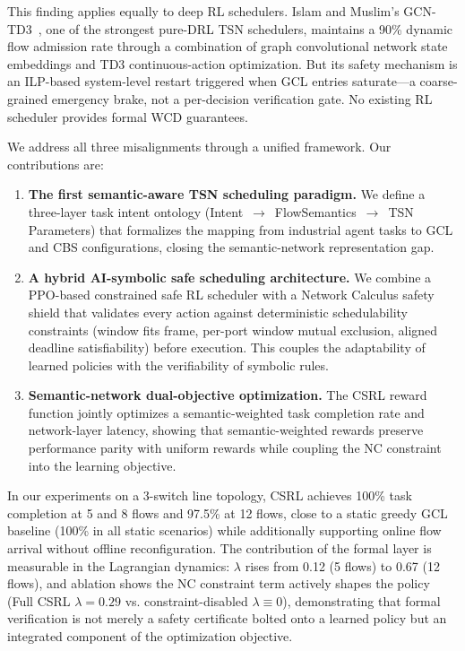 \documentclass[conference]{IEEEtran}
\begin{document}
This finding applies equally to deep RL schedulers. Islam and Muslim's GCN-TD3~\cite{islam2024gcntd3}, one of the strongest pure-DRL TSN schedulers, maintains a 90\% dynamic flow admission rate through a combination of graph convolutional network state embeddings and TD3 continuous-action optimization. But its safety mechanism is an ILP-based system-level restart triggered when GCL entries saturate---a coarse-grained emergency brake, not a per-decision verification gate. No existing RL scheduler provides formal WCD guarantees.

We address all three misalignments through a unified framework. Our contributions are:

\begin{enumerate}
\item \textbf{The first semantic-aware TSN scheduling paradigm.} We define a three-layer task intent ontology (Intent~$\rightarrow$~FlowSemantics~$\rightarrow$~TSN Parameters) that formalizes the mapping from industrial agent tasks to GCL and CBS configurations, closing the semantic-network representation gap.
\item \textbf{A hybrid AI-symbolic safe scheduling architecture.} We combine a PPO-based constrained safe RL scheduler with a Network Calculus safety shield that validates every action against deterministic schedulability constraints (window fits frame, per-port window mutual exclusion, aligned deadline satisfiability) before execution. This couples the adaptability of learned policies with the verifiability of symbolic rules.
\item \textbf{Semantic-network dual-objective optimization.} The CSRL reward function jointly optimizes a semantic-weighted task completion rate and network-layer latency, showing that semantic-weighted rewards preserve performance parity with uniform rewards while coupling the NC constraint into the learning objective.
\end{enumerate}

In our experiments on a 3-switch line topology, CSRL achieves 100\% task completion at 5 and 8 flows and 97.5\% at 12 flows, close to a static greedy GCL baseline (100\% in all static scenarios) while additionally supporting online flow arrival without offline reconfiguration. The contribution of the formal layer is measurable in the Lagrangian dynamics: $\lambda$ rises from 0.12 (5 flows) to 0.67 (12 flows), and ablation shows the NC constraint term actively shapes the policy (Full CSRL $\lambda=0.29$ vs. constraint-disabled $\lambda\equiv0$), demonstrating that formal verification is not merely a safety certificate bolted onto a learned policy but an integrated component of the optimization objective.
\end{document}
